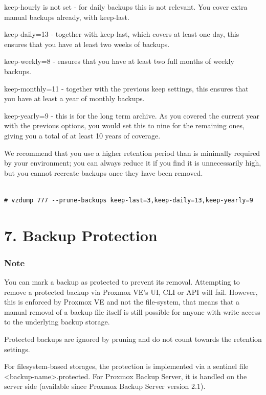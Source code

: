 keep-hourly is not set - for daily backups this is not relevant. You cover extra manual backups already, with keep-last.

keep-daily=13 - together with keep-last, which covers at least one day, this ensures that you have at least two weeks of backups.

keep-weekly=8 - ensures that you have at least two full months of weekly backups.

keep-monthly=11 - together with the previous keep settings, this ensures that you have at least a year of monthly backups.

keep-yearly=9 - this is for the long term archive. As you covered the current year with the previous options, you would set this to nine for the remaining ones, giving you a total of at least 10 years of coverage.

We recommend that you use a higher retention period than is minimally required by your environment; you can always reduce it if you find it is unnecessarily high, but you cannot recreate backups once they have been removed.

\begin{lstlisting}

# vzdump 777 --prune-backups keep-last=3,keep-daily=13,keep-yearly=9

\end{lstlisting}


\section{7. Backup Protection}

\subsubsection{Note}

You can mark a backup as protected to prevent its removal. Attempting to remove a protected backup via Proxmox VE’s UI, CLI or API will fail. However, this is enforced by Proxmox VE and not the file-system, that means that a manual removal of a backup file itself is still possible for anyone with write access to the underlying backup storage.

Protected backups are ignored by pruning and do not count towards the retention settings.

For filesystem-based storages, the protection is implemented via a sentinel file <backup-name>.protected. For Proxmox Backup Server, it is handled on the server side (available since Proxmox Backup Server version 2.1).

